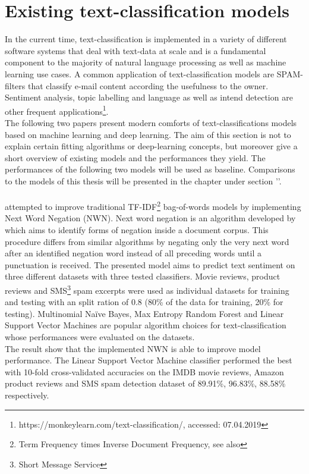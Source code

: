 \section{Existing text-classification models}\label{existing_text_class_models}
In the current time, text-classification is implemented in a variety of different software systems that deal with text-data at scale and is a fundamental component to the majority of natural language processing as well as machine learning use cases. A common application of text-classification models are SPAM-filters that classify e-mail content according the usefulness to the owner. Sentiment analysis, topic labelling and language as well as intend detection are other frequent applications\footnote{https://monkeylearn.com/text-classification/, accessed: 07.04.2019}.\\
The following two papers present modern comforts of text-classifications models based on machine learning and deep learning. The aim of this section is not to explain certain fitting algorithms or deep-learning concepts, but moreover give a short overview of existing models and the performances they yield. The performances of the following two models will be used as baseline. Comparisons to the models of this thesis will be presented in the  chapter under section ''. 

\paragraph*{\textcite{Das2018}} attempted to improve traditional TF-IDF\footnote{Term Frequency times Inverse Document Frequency, see also } bag-of-words models by implementing Next Word Negation (NWN). Next word negation is an algorithm developed by \textcite{Das2018} which aims to identify forms of negation inside a document corpus. This procedure differs from similar algorithms by negating only the very next word after an identified negation word instead of all preceding words until a punctuation is received. The presented model aims to predict text sentiment on three different datasets with three tested classifiers. Movie reviews, product reviews and SMS\footnote{Short Message Service} spam excerpts were used as individual datasets for training and testing with an split ration of 0.8 (80\% of the data for training, 20\%  for testing). Multinomial Na\"ive Bayes, Max Entropy Random Forest and Linear Support Vector Machines are popular algorithm choices for text-classification whose performances were evaluated on the datasets. \\
The result show that the implemented NWN is able to improve model performance. The Linear Support Vector Machine classifier performed the best with 10-fold cross-validated accuracies on the IMDB movie reviews, Amazon product reviews and SMS spam detection dataset of 89.91\%, 96.83\%, 88.58\% respectively.

